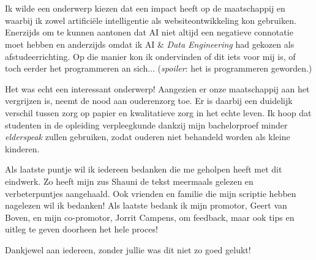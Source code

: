 
\chapter*{}
\label{ch:voorwoord}


Ik wilde een onderwerp kiezen dat een impact heeft op de maatschappij en waarbij ik zowel artificiële intelligentie als websiteontwikkeling kon gebruiken. Enerzijds om te kunnen aantonen dat AI niet altijd een negatieve connotatie moet hebben en anderzijds omdat ik AI \& \textit{Data Engineering} had gekozen als afstudeerrichting. Op die manier kon ik ondervinden of dit iets voor mij is, of toch eerder het programmeren an sich$\ldots$ (\textit{spoiler}: het is programmeren geworden.)

Het was echt een interessant onderwerp! Aangezien er onze maatschappij aan het vergrijzen is, neemt de nood aan ouderenzorg toe. Er is daarbij een duidelijk verschil tussen zorg op papier en kwalitatieve zorg in het echte leven. Ik hoop dat studenten in de opleiding verpleegkunde dankzij mijn bachelorproef minder \textit{elderspeak} zullen gebruiken, zodat ouderen niet behandeld worden als kleine kinderen.

Als laatste puntje wil ik iedereen bedanken die me geholpen heeft met dit eindwerk. Zo heeft mijn zus Shauni de tekst meermaals gelezen en verbeterpuntjes aangehaald. Ook vrienden en familie die mijn scriptie hebben nagelezen wil ik bedanken!
Als laatste bedank ik mijn promotor, Geert van Boven, en mijn co-promotor, Jorrit Campens, om feedback, maar ook tips en uitleg te geven doorheen het hele proces!

Dankjewel aan iedereen, zonder jullie was dit niet zo goed gelukt!